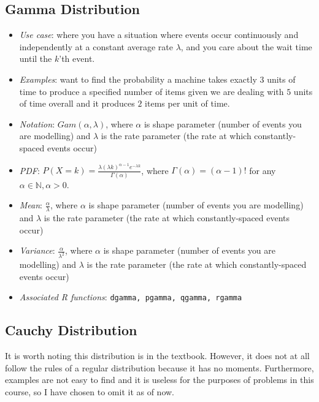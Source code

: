\documentclass[12pt]{article}
\begin{document}
\subsection*{Gamma Distribution}

\begin{itemize}
	\item \textit{Use case}: where you have a situation where events occur
	      continuously and independently at a constant average rate $\lambda$,
	      and you care about the wait time until the $k$'th event.
	\item \textit{Examples}: want to find the probability a machine takes
	      exactly $3$ units of time to produce a specified number of items given
	      we are dealing with $5$ units of time overall and it produces $2$ items
	      per unit of time.
	\item \textit{Notation}: $Gam(\alpha, \lambda)$, where $\alpha$ is shape
	      parameter (number of events you are modelling) and $\lambda$ is the
	      rate parameter (the rate at which constantly-spaced events occur)
	\item \textit{PDF}: $P(X = k) = \frac{\lambda(\lambda k)^{\alpha - 1}
			      e^{-\lambda k}}{\Gamma(\alpha)}$, where $\Gamma(\alpha) =
		      (\alpha - 1)!$ for any $\alpha \in \mathbb{N}, \alpha > 0$.
	\item \textit{Mean}: $\frac{\alpha}{\lambda}$, where $\alpha$ is shape
	      parameter (number of events you are modelling) and $\lambda$ is the
	      rate parameter (the rate at which constantly-spaced events occur)
	\item \textit{Variance}: $\frac{\alpha}{\lambda^2}$, where $\alpha$ is shape
	      parameter (number of events you are modelling) and $\lambda$ is the
	      rate parameter (the rate at which constantly-spaced events occur)
	\item \textit{Associated R functions}: \verb|dgamma, pgamma, qgamma, rgamma|
\end{itemize}

\subsection*{Cauchy Distribution}

It is worth noting this distribution is in the textbook. However, it does not
at all follow the rules of a regular distribution because it has no moments.
Furthermore, examples are not easy to find and it is useless for the purposes
of problems in this course, so I have chosen to omit it as of now.
\end{document}
